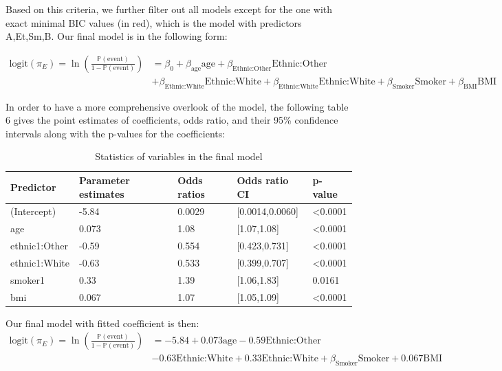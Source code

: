 \documentclass[12pt]{article}
\begin{document}
Based on this criteria, we further filter out all models except for the one with exact minimal BIC values (in red), which is the model with predictors A,Et,Sm,B. Our final model is in the following form:

{\small
\begin{align*}
\text{logit}(\pi_E)=\ln  \left( \frac{\mathbb{P}(\text{event})}{1-\mathbb{P}(\text{event})} \right)&=\beta_0+ \beta_{\text{age}} \text{age}+ \beta_{\text{Ethnic:Other}} \text{Ethnic:Other} \\
&+\beta_{\text{Ethnic:White}} \text{Ethnic:White}
+\beta_{\text{Ethnic:White}} \text{Ethnic:White}+\beta_{\text{Smoker}} \text{Smoker} + \beta_{\text{BMI}} \text{BMI}
\end{align*}
}%

In order to have a more comprehensive overlook of the model, the following table 6 gives the point estimates of coefficients, odds ratio, and their 95\% confidence intervals along with the p-values for the coefficients:

\begin{table}[!ht]
\caption{Statistics of variables in the final model}
    \centering
    \begin{tabular}{lllll}
    \hline
    \hline
        \textbf{Predictor}  & \textbf{Parameter estimates}  & \textbf{Odds ratios}  & \textbf{Odds ratio CI}  & \textbf{p-value} \\ \hline
        (Intercept) & -5.84 & 0.0029 & [0.0014,0.0060] & <0.0001 \\ \hline
        age & 0.073 & 1.08 & [1.07,1.08] & <0.0001 \\ \hline
        ethnic1:Other & -0.59 & 0.554 & [0.423,0.731] & <0.0001 \\ \hline
        ethnic1:White & -0.63 & 0.533 & [0.399,0.707] & <0.0001 \\ \hline
        smoker1 & 0.33 & 1.39 & [1.06,1.83] & 0.0161 \\ \hline
        bmi & 0.067 & 1.07 & [1.05,1.09] & <0.0001 \\ \hline
        \hline
    \end{tabular}
\end{table}
Our final model with fitted coefficient is then:
{\small
\begin{align*}
\text{logit}(\pi_E)=\ln  \left( \frac{\mathbb{P}(\text{event})}{1-\mathbb{P}(\text{event})} \right)&=-5.84+ 0.073 \text{age}-0.59 \text{Ethnic:Other} \\
&-0.63\text{Ethnic:White}
+0.33\text{Ethnic:White}+\beta_{\text{Smoker}} \text{Smoker} + 0.067 \text{BMI}
\end{align*}
}%
\end{document}
